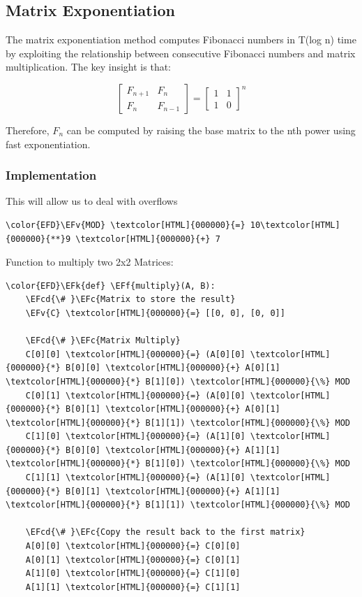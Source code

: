 \documentclass[a4paper,12pt]{article}
\newcommand{\EFc}[1]{\textcolor{EFc}{#1}} %
\newcommand{\EFcd}[1]{\textcolor{EFcd}{#1}} %
\newcommand{\EFk}[1]{\textcolor{EFk}{#1}} %
\newcommand{\EFf}[1]{\textcolor{EFf}{#1}} %
\newcommand{\EFv}[1]{\textcolor{EFv}{#1}} %
\begin{document}
\subsection{Matrix Exponentiation}
\label{sec:org269d6fc}
The matrix exponentiation method computes Fibonacci numbers in T(log n) time by exploiting the relationship between consecutive Fibonacci numbers and matrix multiplication. The key insight is that:

\[ \begin{bmatrix} F_{n+1} & F_n \\ F_n & F_{n-1} \end{bmatrix} = \begin{bmatrix} 1 & 1 \\ 1 & 0 \end{bmatrix}^n \]

Therefore, \(F_n\) can be computed by raising the base matrix to the nth power using fast exponentiation.
\subsubsection{Implementation}
\label{sec:org88785a7}
This will allow us to deal with overflows
\begin{Code}
\begin{Verbatim}
\color{EFD}\EFv{MOD} \textcolor[HTML]{000000}{=} 10\textcolor[HTML]{000000}{**}9 \textcolor[HTML]{000000}{+} 7
\end{Verbatim}
\end{Code}

Function to multiply two 2x2 Matrices:
\begin{Code}
\begin{Verbatim}
\color{EFD}\EFk{def} \EFf{multiply}(A, B):
    \EFcd{\# }\EFc{Matrix to store the result}
    \EFv{C} \textcolor[HTML]{000000}{=} [[0, 0], [0, 0]]

    \EFcd{\# }\EFc{Matrix Multiply}
    C[0][0] \textcolor[HTML]{000000}{=} (A[0][0] \textcolor[HTML]{000000}{*} B[0][0] \textcolor[HTML]{000000}{+} A[0][1] \textcolor[HTML]{000000}{*} B[1][0]) \textcolor[HTML]{000000}{\%} MOD
    C[0][1] \textcolor[HTML]{000000}{=} (A[0][0] \textcolor[HTML]{000000}{*} B[0][1] \textcolor[HTML]{000000}{+} A[0][1] \textcolor[HTML]{000000}{*} B[1][1]) \textcolor[HTML]{000000}{\%} MOD
    C[1][0] \textcolor[HTML]{000000}{=} (A[1][0] \textcolor[HTML]{000000}{*} B[0][0] \textcolor[HTML]{000000}{+} A[1][1] \textcolor[HTML]{000000}{*} B[1][0]) \textcolor[HTML]{000000}{\%} MOD
    C[1][1] \textcolor[HTML]{000000}{=} (A[1][0] \textcolor[HTML]{000000}{*} B[0][1] \textcolor[HTML]{000000}{+} A[1][1] \textcolor[HTML]{000000}{*} B[1][1]) \textcolor[HTML]{000000}{\%} MOD

    \EFcd{\# }\EFc{Copy the result back to the first matrix}
    A[0][0] \textcolor[HTML]{000000}{=} C[0][0]
    A[0][1] \textcolor[HTML]{000000}{=} C[0][1]
    A[1][0] \textcolor[HTML]{000000}{=} C[1][0]
    A[1][1] \textcolor[HTML]{000000}{=} C[1][1]
\end{Verbatim}
\end{Code}
\end{document}

